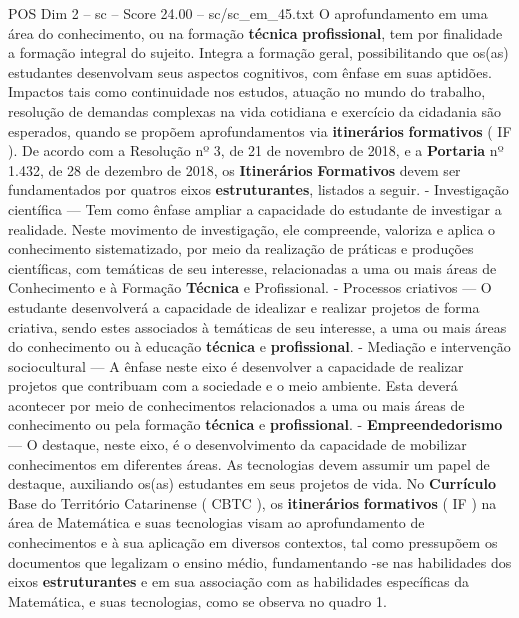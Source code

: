 \begin{textsample}{POS Dim 2 – sc – Score 24.00 – sc/sc\_em\_45.txt}
O aprofundamento em uma área do conhecimento, ou na formação \textbf{técnica} \textbf{profissional}, tem por finalidade a formação integral do sujeito.
Integra a formação geral, possibilitando que os(as) estudantes desenvolvam seus aspectos cognitivos, com ênfase em suas aptidões.
Impactos tais como continuidade nos estudos, atuação no mundo do trabalho, resolução de demandas complexas na vida cotidiana e exercício da cidadania são esperados, quando se propõem aprofundamentos via \textbf{itinerários} \textbf{formativos} ( IF ).
De acordo com a Resolução nº 3, de 21 de novembro de 2018, e a \textbf{Portaria} nº 1.432, de 28 de dezembro de 2018, os \textbf{Itinerários} \textbf{Formativos} devem ser fundamentados por quatros eixos \textbf{estruturantes}, listados a seguir. - Investigação científica — Tem como ênfase ampliar a capacidade do estudante de investigar a realidade.
Neste movimento de investigação, ele compreende, valoriza e aplica o conhecimento sistematizado, por meio da realização de práticas e produções científicas, com temáticas de seu interesse, relacionadas a uma ou mais áreas de Conhecimento e à Formação \textbf{Técnica} e Profissional. - Processos criativos — O estudante desenvolverá a capacidade de idealizar e realizar projetos de forma criativa, sendo estes associados à temáticas de seu interesse, a uma ou mais áreas do conhecimento ou à educação \textbf{técnica} e \textbf{profissional}. - Mediação e intervenção sociocultural — A ênfase neste eixo é desenvolver a capacidade de realizar projetos que contribuam com a sociedade e o meio ambiente.
Esta deverá acontecer por meio de conhecimentos relacionados a uma ou mais áreas de conhecimento ou pela formação \textbf{técnica} e \textbf{profissional}. - \textbf{Empreendedorismo} — O destaque, neste eixo, é o desenvolvimento da capacidade de mobilizar conhecimentos em diferentes áreas.
As tecnologias devem assumir um papel de destaque, auxiliando os(as) estudantes em seus projetos de vida.
No \textbf{Currículo} Base do Território Catarinense ( CBTC ), os \textbf{itinerários} \textbf{formativos} ( IF ) na área de Matemática e suas tecnologias visam ao aprofundamento de conhecimentos e à sua aplicação em diversos contextos, tal como pressupõem os documentos que legalizam o ensino médio, fundamentando -se nas habilidades dos eixos \textbf{estruturantes} e em sua associação com as habilidades específicas da Matemática, e suas tecnologias, como se observa no quadro 1.

\end{textsample}
